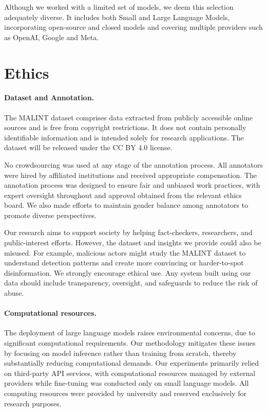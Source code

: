 \documentclass[11pt]{article}
\begin{document}
Although we worked with a limited set of models, we deem this selection adequately diverse. It includes both Small and Large Language Models, incorporating open-source and closed models and covering multiple providers such as OpenAI, Google and Meta.




\section*{Ethics}
\paragraph{Dataset and Annotation.} The MALINT dataset comprises data extracted from publicly accessible online sources and is free from copyright restrictions. It does not contain personally identifiable information and is intended solely for research applications. The dataset will be released under the CC BY 4.0 license.

No crowdsourcing was used at any stage of the annotation process. All annotators were hired by affiliated institutions and received appropriate compensation. The annotation process was designed to ensure fair and unbiased work practices, with expert oversight throughout and approval obtained from the relevant ethics board. We also made efforts to maintain gender balance among annotators to promote diverse perspectives.


Our research aims to support society by helping fact-checkers, researchers, and public-interest efforts. However, the dataset and insights we provide could also be misused. For example, malicious actors might study the MALINT dataset to understand detection patterns and create more convincing or harder-to-spot disinformation. We strongly encourage ethical use. Any system built using our data should include transparency, oversight, and safeguards to reduce the risk of abuse.


\paragraph{Computational resources.} The deployment of large language models raises environmental concerns, due to significant computational requirements. Our methodology mitigates these issues by focusing on model inference rather than training from scratch, thereby substantially reducing computational demands. Our experiments primarily relied on third-party API services, with computational resources managed by external providers while fine-tuning was conducted only on small language models. All computing resources were provided by university and reserved exclusively for research purposes.
\end{document}
